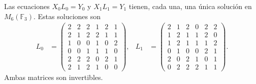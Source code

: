 \begin{theorem}
\label{thm:df-elevaciones-reconstruidas}
Las ecuaciones \(X_0L_0=Y_0\) y \(X_1L_1=Y_1\) tienen, cada una, una
única solución en \(M_6(\mathbb F_3)\). Estas soluciones son
\begin{align*}
 L_0&=\begin{pmatrix}
2&2&2&1&2&1\\2&1&2&2&1&1\\1&0&0&1&0&2\\
0&0&1&1&1&0\\2&2&2&0&2&1\\2&1&2&1&0&0
\end{pmatrix},&
 L_1&=\begin{pmatrix}
2&1&2&0&2&2\\1&2&1&1&2&0\\1&2&1&1&1&2\\
0&1&0&0&2&1\\2&0&2&1&0&1\\0&2&2&2&1&1
\end{pmatrix}.
\end{align*}
Ambas matrices son invertibles.
\end{theorem}

